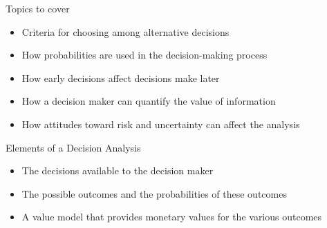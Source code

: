 \documentclass{beamer}\usepackage[]{graphicx}\usepackage[]{color}
\begin{document}
\begin{darkframes}
    \begin{frame}[fragile]{Topics to cover}
    \fontsize{10}{10}\selectfont
          \begin{itemize}[<+->]
            \item Criteria for choosing among alternative decisions
            \item How probabilities are used in the decision-making process
            \item How early decisions affect decisions make later
            \item How a decision maker can quantify the value of information
            \item How attitudes toward risk and uncertainty can affect the analysis
          \end{itemize}

    \end{frame}


    \begin{frame}[fragile]{Elements of a Decision Analysis}
      \fontsize{10}{10}\selectfont  

        \begin{itemize}
            \item The decisions available to the decision maker
            \item The possible outcomes and the probabilities of these outcomes
            \item A value model that provides monetary values for the various outcomes
        \end{itemize}


    \end{frame}



\end{darkframes}
\end{document}
